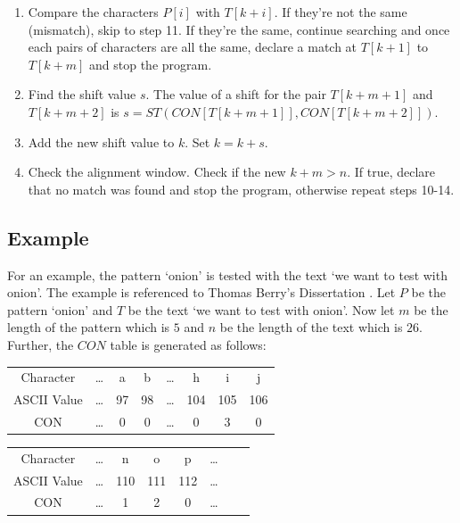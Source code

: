 \begin{enumerate}
	\item Compare the characters $P[i]$ with $T[k + i]$. If they're not the same (mismatch), skip to step 11. If they're the same, continue searching and once each pairs of characters are all the same, declare a match at $T[k+1]$ to $T[k+m]$ and stop the program.

\item Find the shift value $s$. The value of a shift for the pair $T [k +m+ 1]$ and $T [k +m+ 2]$ is $s = ST (CON[T[k + m+ 1]], CON[ T [k +m+ 2]])$. 
	
\item Add the new shift value to $k$. Set $k=k+s$.

\item Check the alignment window. Check if the new $k+m > n$. If true, declare that no match was found and stop the program, otherwise repeat steps 10-14. 

\end{enumerate}
\subsection{Example}
For an example, the pattern `onion' is tested with the text `we want to test with onion'. The example is referenced to Thomas Berry's Dissertation \cite{berry}. 
Let $P$ be the pattern `onion' and $T$ be the text `we want to test with onion'. Now let $m$ be the length of the pattern which is $5$ and $n$ be the length of the text which is $26$. Further, the $CON$ table is generated as follows:

\begin{center}
\begin{tabular}{ c c c c c c c c }
 Character & \ldots & a & b & \ldots & h & i & j \\ 
 ASCII Value & \ldots & 97 & 98 & \ldots & 104 & 105 & 106 \\  
 CON & \ldots & 0 & 0 & \ldots & 0 & 3 & 0    
\end{tabular}
\end{center}

\begin{center}
\begin{tabular}{ c c c c c c c c }
 Character & \ldots & n & o & p & \ldots \\ 
 ASCII Value & \ldots & 110 & 111 & 112 & \ldots \\  
 CON & \ldots & 1 & 2 & 0 & \ldots   
\end{tabular}
\end{center}

